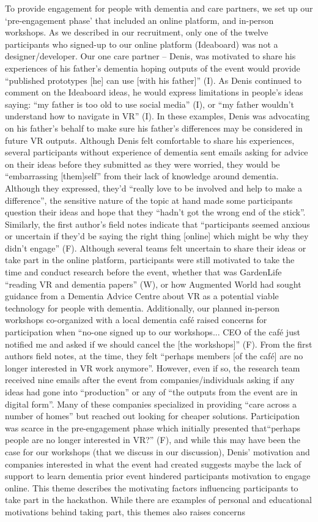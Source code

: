 To provide engagement for people with dementia and care partners, we set up our ‘pre-engagement phase’ that included an online platform, and in-person workshops. As we described in our recruitment, only one of the twelve participants who signed-up to our online platform (Ideaboard) was not a designer/developer. Our one care partner – Denis, was motivated to share his experiences of his father’s dementia hoping outputs of the event would provide “published prototypes [he] can use [with his father]” (I). As Denis continued to comment on the Ideaboard ideas, he would express limitations in people’s ideas saying: “my father is too old to use social media” (I), or “my father wouldn’t understand how to navigate in VR” (I). In these examples, Denis was advocating on his father’s behalf to make sure his father’s differences may be considered in future VR outputs. Although Denis felt comfortable to share his experiences, several participants without experience of dementia sent emails asking for advice on their ideas before they submitted as they were worried, they would be “embarrassing [them]self” from their lack of knowledge around dementia. Although they expressed, they’d “really love to be involved and help to make a difference”, the sensitive nature of the topic at hand made some participants question their ideas and hope that they “hadn’t got the wrong end of the stick”. Similarly, the first author’s field notes indicate that “participants seemed anxious or uncertain if they’d be saying the right thing [online] which might be why they didn’t engage” (F). Although several teams felt uncertain to share their ideas or take part in the online platform, participants were still motivated to take the time and conduct research before the event, whether that was GardenLife “reading VR and dementia papers” (W), or how Augmented World had sought guidance from a Dementia Advice Centre about VR as a potential viable technology for people with dementia. Additionally, our planned in-person workshops co-organized with a local dementia café raised concerns for participation when “no-one signed up to our workshops... CEO of the café just notified me and asked if we should cancel the [the workshops]” (F). From the first authors field notes, at the time, they felt “perhaps members [of the café] are no longer interested in VR work anymore”. However, even if so, the research team received nine emails after the event from companies/individuals asking if any ideas had gone into “production” or any of “the outputs from the event are in digital form”. Many of these companies specialized in providing “care across a number of homes” but reached out looking for cheaper solutions. Participation was scarce in the pre-engagement phase which initially presented that“perhaps people are no longer interested in VR?” (F), and while this may have been the case for our workshops (that we discuss in our discussion), Denis’ motivation and companies interested in what the event had created suggests maybe the lack of support to learn dementia prior event hindered participants motivation to engage online. This theme describes the motivating factors influencing participants to take part in the hackathon. While there are examples of personal and educational motivations behind taking part, this themes also raises concerns 